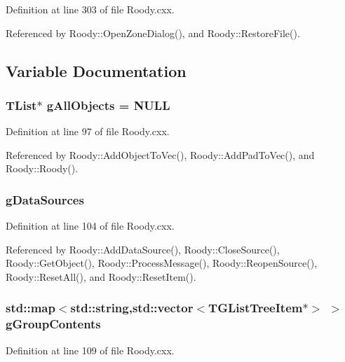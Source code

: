 Definition at line 303 of file Roody.cxx.



Referenced by Roody::OpenZoneDialog(), and Roody::RestoreFile().



\subsection{Variable Documentation}
\subsubsection[{gAllObjects}]{\setlength{\rightskip}{0pt plus 5cm}TList$\ast$ {\bf gAllObjects} = NULL}\label{Roody_8cxx_a228bf9afef4c54d62ad5d408db7311d0}


Definition at line 97 of file Roody.cxx.



Referenced by Roody::AddObjectToVec(), Roody::AddPadToVec(), and Roody::Roody().

\subsubsection[{gDataSources}]{ {\bf gDataSources}}\label{Roody_8cxx_a9af39400d262b56f7e186b62b786c424}


Definition at line 104 of file Roody.cxx.



Referenced by Roody::AddDataSource(), Roody::CloseSource(), Roody::GetObject(), Roody::ProcessMessage(), Roody::ReopenSource(), Roody::ResetAll(), and Roody::ResetItem().

\subsubsection[{gGroupContents}]{\setlength{\rightskip}{0pt plus 5cm}std::map$<$std::string,std::vector$<$TGListTreeItem$\ast$$>$ $>$ {\bf gGroupContents}}\label{Roody_8cxx_a84676ea47b401c2f644bcef0359b27d7}


Definition at line 109 of file Roody.cxx.

